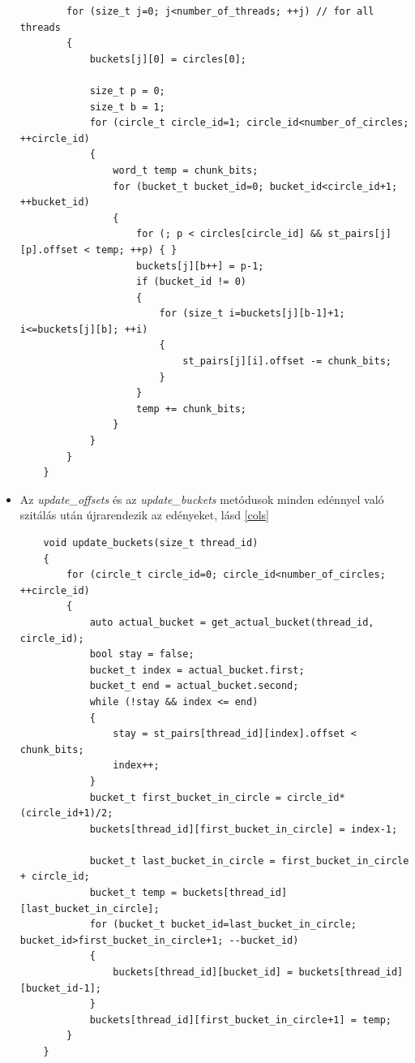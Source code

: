 \documentclass[twoside, a4paper, 12pt]{article}
\begin{document}
\begin{itemize}
\begin{lstlisting}
		for (size_t j=0; j<number_of_threads; ++j) // for all threads
		{
			buckets[j][0] = circles[0];
		
			size_t p = 0;
			size_t b = 1;
			for (circle_t circle_id=1; circle_id<number_of_circles; ++circle_id)
			{
				word_t temp = chunk_bits;
				for (bucket_t bucket_id=0; bucket_id<circle_id+1; ++bucket_id)
				{
					for (; p < circles[circle_id] && st_pairs[j][p].offset < temp; ++p) { }
					buckets[j][b++] = p-1;
					if (bucket_id != 0)
					{
						for (size_t i=buckets[j][b-1]+1; i<=buckets[j][b]; ++i)
						{
							st_pairs[j][i].offset -= chunk_bits;
						}
					}
					temp += chunk_bits;
				}
			}		
		}
	}
\end{lstlisting}
\item Az \textit{update\_offsets} és az \textit{update\_buckets} metódusok minden edénnyel való szitálás után újrarendezik az edényeket, lásd \ref{cols}
\begin{lstlisting}
	void update_buckets(size_t thread_id)
	{
		for (circle_t circle_id=0; circle_id<number_of_circles; ++circle_id)
		{
			auto actual_bucket = get_actual_bucket(thread_id, circle_id);
			bool stay = false;
			bucket_t index = actual_bucket.first;
			bucket_t end = actual_bucket.second;
			while (!stay && index <= end)
			{
				stay = st_pairs[thread_id][index].offset < chunk_bits;
				index++;
			}
			bucket_t first_bucket_in_circle = circle_id*(circle_id+1)/2;
			buckets[thread_id][first_bucket_in_circle] = index-1;
			
			bucket_t last_bucket_in_circle = first_bucket_in_circle + circle_id;
			bucket_t temp = buckets[thread_id][last_bucket_in_circle];
			for (bucket_t bucket_id=last_bucket_in_circle; bucket_id>first_bucket_in_circle+1; --bucket_id)
			{
				buckets[thread_id][bucket_id] = buckets[thread_id][bucket_id-1];
			}
			buckets[thread_id][first_bucket_in_circle+1] = temp;
		}	
	}
\end{lstlisting}
\end{itemize}
\end{document}
